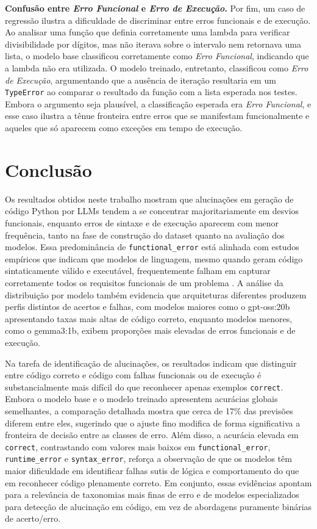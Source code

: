 \documentclass[conference]{IEEEtran}
\begin{document}
\textbf{Confusão entre \emph{Erro Funcional} e \emph{Erro de Execução}.}
Por fim, um caso de regressão ilustra a dificuldade de discriminar entre erros funcionais e de execução. Ao analisar uma função que definia corretamente uma lambda para verificar divisibilidade por dígitos, mas não iterava sobre o intervalo nem retornava uma lista, o modelo base classificou corretamente como \emph{Erro Funcional}, indicando que a lambda não era utilizada. O modelo treinado, entretanto, classificou como \emph{Erro de Execução}, argumentando que a ausência de iteração resultaria em um \texttt{TypeError} ao comparar o resultado da função com a lista esperada nos testes. Embora o argumento seja plausível, a classificação esperada era \emph{Erro Funcional}, e esse caso ilustra a tênue fronteira entre erros que se manifestam funcionalmente e aqueles que só aparecem como exceções em tempo de execução.

\section{Conclusão}

Os resultados obtidos neste trabalho mostram que alucinações em geração de código Python por LLMs tendem a se concentrar majoritariamente em desvios funcionais, enquanto erros de sintaxe e de execução aparecem com menor frequência, tanto na fase de construção do dataset quanto na avaliação dos modelos. Essa predominância de \texttt{functional\_error} está alinhada com estudos empíricos que indicam que modelos de linguagem, mesmo quando geram código sintaticamente válido e executável, frequentemente falham em capturar corretamente todos os requisitos funcionais de um problema \cite{2407.06153,2504.20799}. A análise da distribuição por modelo também evidencia que arquiteturas diferentes produzem perfis distintos de acertos e falhas, com modelos maiores como o gpt-oss:20b apresentando taxas mais altas de código correto, enquanto modelos menores, como o gemma3:1b, exibem proporções mais elevadas de erros funcionais e de execução.

Na tarefa de identificação de alucinações, os resultados indicam que distinguir entre código correto e código com falhas funcionais ou de execução é substancialmente mais difícil do que reconhecer apenas exemplos \texttt{correct}. Embora o modelo base e o modelo treinado apresentem acurácias globais semelhantes, a comparação detalhada mostra que cerca de 17\% das previsões diferem entre eles, sugerindo que o ajuste fino modifica de forma significativa a fronteira de decisão entre as classes de erro. Além disso, a acurácia elevada em \texttt{correct}, contrastando com valores mais baixos em \texttt{functional\_error}, \texttt{runtime\_error} e \texttt{syntax\_error}, reforça a observação de que os modelos têm maior dificuldade em identificar falhas sutis de lógica e comportamento do que em reconhecer código plenamente correto. Em conjunto, essas evidências apontam para a relevância de taxonomias mais finas de erro e de modelos especializados para detecção de alucinação em código, em vez de abordagens puramente binárias de acerto/erro.
\end{document}
